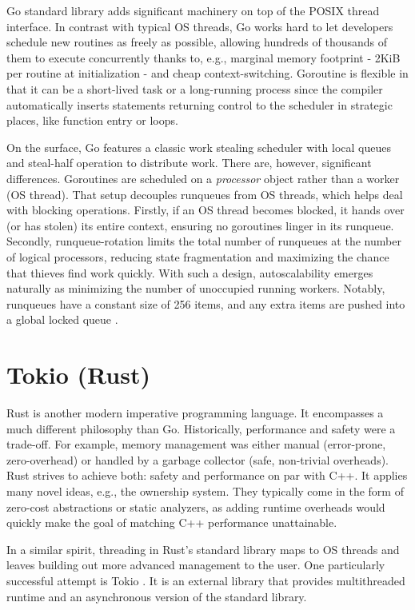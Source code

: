 \documentclass[12pt,a4paper,twoside]{report}
\begin{document}
Go standard library adds significant machinery on top of the POSIX thread interface. In contrast with typical OS threads, Go works hard to let developers schedule new routines as freely as possible, allowing hundreds of thousands of them to execute concurrently thanks to, e.g., marginal memory footprint - 2KiB per routine at initialization - and cheap context-switching. Goroutine is flexible in that it can be a short-lived task or a long-running process since the compiler automatically inserts statements returning control to the scheduler in strategic places, like function entry or loops. 

On the surface, Go features a classic work stealing scheduler with local queues and steal-half operation to distribute work. There are, however, significant differences. Goroutines are scheduled on a \textit{processor} object rather than a worker (OS thread). That setup decouples runqueues from OS threads, which helps deal with blocking operations. Firstly, if an OS thread becomes blocked, it hands over (or has stolen) its entire context, ensuring no goroutines linger in its runqueue. Secondly, runqueue-rotation limits the total number of runqueues at the number of logical processors, reducing state fragmentation and maximizing the chance that thieves find work quickly. With such a design, autoscalability emerges naturally as minimizing the number of unoccupied running workers. Notably, runqueues have a constant size of 256 items, and any extra items are pushed into a global locked queue \cite{goprocgo7:online}. 


\section{Tokio (Rust)}
\label{section:rel-work-rust}
Rust is another modern imperative programming language. It encompasses a much different philosophy than Go. Historically, performance and safety were a trade-off. For example, memory management was either manual (error-prone, zero-overhead) or handled by a garbage collector (safe, non-trivial overheads). Rust strives to achieve both: safety and performance on par with C++. It applies many novel ideas, e.g., the ownership system. They typically come in the form of zero-cost abstractions or static analyzers, as adding runtime overheads would quickly make the goal of matching C++ performance unattainable. 

In a similar spirit, threading in Rust's standard library maps to OS threads and leaves building out more advanced management to the user. One particularly successful attempt is Tokio \cite{TokioAna8:online}. It is an external library that provides multithreaded runtime and an asynchronous version of the standard library.
\end{document}
